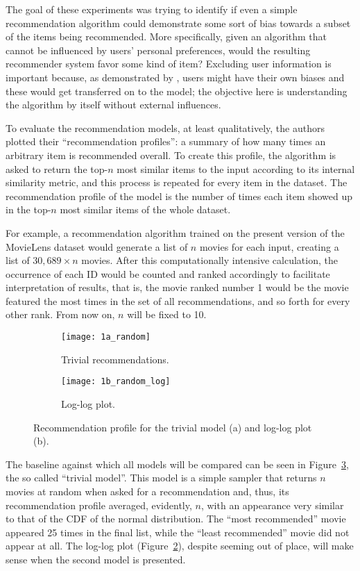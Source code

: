 The goal of these experiments was trying to identify if even a simple
recommendation algorithm could demonstrate some sort of bias towards a subset of
the items being recommended. More specifically, given an algorithm that cannot
be influenced by users' personal preferences, would the resulting recommender
system favor some kind of item? Excluding user information is important because,
as demonstrated by \citet{stoica_algorithmic_2018}, users might have their own
biases and these would get transferred on to the model; the objective here is
understanding the algorithm by itself without external influences.

To evaluate the recommendation models, at least qualitatively, the authors
plotted their ``recommendation profiles'': a summary of how many times an
arbitrary item is recommended overall. To create this profile, the algorithm is
asked to return the top-$n$ most similar items to the input according to its
internal similarity metric, and this process is repeated for every item in the
dataset. The recommendation profile of the model is the number of times each
item showed up in the top-$n$ most similar items of the whole dataset.

For example, a recommendation algorithm trained on the present version of the
MovieLens dataset would generate a list of $n$ movies for each input, creating a
list of $30,689 \times n$ movies. After this computationally intensive calculation,
the occurrence of each ID would be counted and ranked accordingly to facilitate
interpretation of results, that is, the movie ranked number 1 would be the movie
featured the most times in the set of all recommendations, and so forth for
every other rank. From now on, $n$ will be fixed to 10.

\begin{figure}
  \centering
  \begin{subfigure}{0.45\textwidth}
    \centering
    \texttt{[image: 1a\_random]}
    \caption{Trivial recommendations.\label{fig:fig1a}}
  \end{subfigure}
  \begin{subfigure}{0.45\textwidth}
    \centering
    \texttt{[image: 1b\_random\_log]}
    \caption{Log-log plot.\label{fig:fig1b}}
  \end{subfigure}
  \caption{Recommendation profile for the trivial model (a) and log-log plot
    (b).\label{fig:fig1}}
\end{figure}

The baseline against which all models will be compared can be seen in
Figure~\ref{fig:fig1}, the so called ``trivial model''. This model is a simple
sampler that returns $n$ movies at random when asked for a recommendation and,
thus, its recommendation profile averaged, evidently, $n$, with an appearance
very similar to that of the CDF of the normal distribution. The ``most
recommended'' movie appeared 25 times in the final list, while the ``least
recommended'' movie did not appear at all. The log-log plot
(Figure~\ref{fig:fig1b}), despite seeming out of place, will make sense when the
second model is presented.

